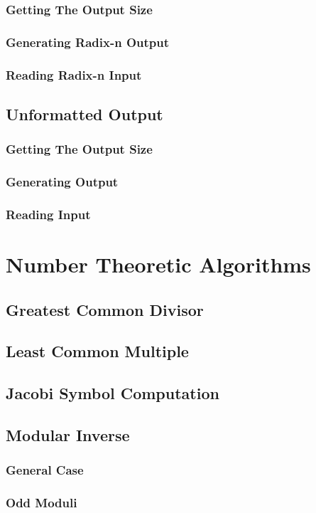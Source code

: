 \documentclass[b5paper]{book}
\begin{document}
\subsection{Getting The Output Size}
\subsection{Generating Radix-n Output}
\subsection{Reading Radix-n Input}
\section{Unformatted Output}
\subsection{Getting The Output Size}
\subsection{Generating Output}
\subsection{Reading Input}

\chapter{Number Theoretic Algorithms}
\section{Greatest Common Divisor}
\section{Least Common Multiple}
\section{Jacobi Symbol Computation}
\section{Modular Inverse}
\subsection{General Case}
\subsection{Odd Moduli}
\end{document}
